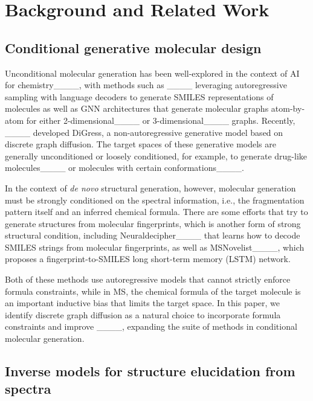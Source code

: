 \section{Background and Related Work}
\subsection{Conditional generative molecular design}

Unconditional molecular generation has been well-explored in the context of AI for chemistry____, with methods such as ____ leveraging autoregressive sampling with language decoders to generate SMILES representations of molecules as well as GNN architectures that generate molecular graphs atom-by-atom for either 2-dimensional____ or 3-dimensional____ graphs. Recently, ____ developed DiGress, a non-autoregressive generative model based on discrete graph diffusion. The target spaces of these generative models are generally unconditioned or loosely conditioned, for example, to generate drug-like molecules____ or molecules with certain conformations____.

In the context of \textit{de novo} structural generation, however, molecular generation must be strongly conditioned on the spectral information, i.e., the fragmentation pattern itself and an inferred chemical formula. There are some efforts that try to generate structures from molecular fingerprints, which is another form of strong structural condition, including Neuraldecipher____ that learns how to decode SMILES strings from molecular fingerprints, as well as MSNovelist____, which proposes a fingerprint-to-SMILES long short-term memory (LSTM) network. 

Both of these methods use autoregressive models that cannot strictly enforce formula constraints, while in MS, the chemical formula of the target molecule is an important inductive bias that limits the target space. In this paper, we identify discrete graph diffusion as a natural choice to incorporate formula constraints and improve ____, expanding the suite of methods in conditional molecular generation.


\subsection{Inverse models for structure elucidation from spectra}

